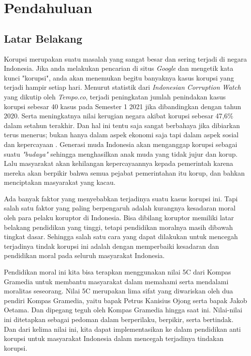 \documentclass[11pt]{article}
\title{\mytitle}
\author{\theauthor}
\begin{document}
\maketitle
\section{Pendahuluan}
    \subsection{Latar Belakang}
    Korupsi merupakan suatu masalah yang sangat besar dan sering terjadi di negara
    Indonesia. Jika anda melakukan pencarian di situs \emph{Google} dan mengetik
    kata kunci "korupsi", anda akan menemukan begitu banyaknya kasus korupsi yang
    terjadi hampir setiap hari. Menurut statistik dari \emph{Indonesian Corruption Watch}
    yang dikutip oleh \emph{Tempo.co}, terjadi peningkatan jumlah penindakan kasus 
    korupsi sebesar 40 kasus pada Semester 1 2021 jika dibandingkan dengan tahun 2020. 
    Serta meningkatnya nilai kerugian negara akibat korupsi sebesar 47,6\% dalam 
    setahun terakhir. Dan hal ini tentu saja sangat berbahaya jika dibiarkan terus
    menerus; bukan hanya dalam aspek ekonomi saja tapi dalam aspek sosial dan
    kepercayaan \citep{setiadiKORUPSIDIINDONESIA2018}.
    Generasi muda Indonesia akan menganggap korupsi sebagai suatu \emph{"budaya"}
    sehingga menghasilkan anak muda yang tidak jujur dan korup. Lalu masyarakat
    akan kehilangan kepercayaannya kepada pemerintah karena mereka akan berpikir
    bahwa semua pejabat pemerintahan itu korup, dan bahkan menciptakan masyarakat 
    yang kacau.

    Ada banyak faktor yang menyebabkan terjadinya suatu kasus korupsi ini. Tapi 
    salah satu faktor yang paling berpengaruh adalah kurangnya kesadaran moral 
    oleh para pelaku koruptor di Indonesia. Bisa dibilang koruptor memiliki latar
    belakang pendidikan yang tinggi, tetapi pendidikan moralnya masih dibawah 
    tingkat dasar. Sehingga salah satu cara yang dapat dilakukan untuk mencegah
    terjadinya tindak korupsi ini adalah dengan memperbaiki kesadaran dan pendidikan
    moral pada seluruh masyarakat Indonesia. 

    Pendidikan moral ini kita bisa terapkan menggunakan nilai 5C dari Kompas
    Gramedia untuk membantu masyarakat dalam memahami serta mendalami moralitas 
    seseorang. Nilai 5C merupakan lima sifat yang diwariskan oleh dua pendiri Kompas
    Gramedia, yaitu bapak Petrus Kanisius Ojong serta bapak Jakob Oetama. Dan 
    dipegang teguh oleh Kompas Gramedia hingga saat ini. Nilai-nilai ini ditetapkan
    sebagai pedoman dalam berperilaku, berpikir, serta bertindak. Dan dari kelima
    nilai ini, kita dapat implementasikan ke dalam pendidikan anti korupsi untuk
    masyarakat Indonesia dalam mencegah terjadinya tindakan korupsi.
\end{document}
